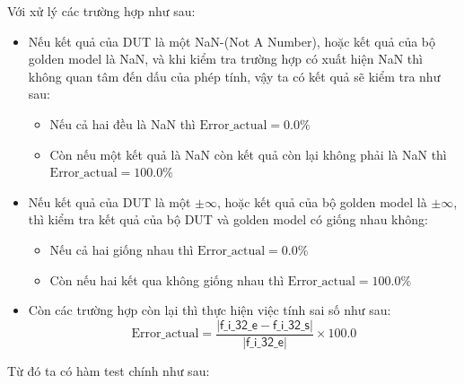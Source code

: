 Với xử lý các trường hợp như sau: 

\begin{itemize}
	\item Nếu kết quả của DUT là một NaN-(Not A Number), hoặc kết quả của bộ golden model là NaN, và khi kiểm tra trường hợp có xuất hiện NaN thì không quan tâm đến dấu của phép tính, vậy ta có kết quả sẽ kiểm tra như sau:
		\begin{itemize}
			\item Nếu cả hai đều là NaN thì $\text{Error\_actual} = 0.0 \%$
			\item Còn nếu một kết quả là NaN còn kết quả còn lại không phải là NaN thì $\text{Error\_actual} = 100.0 \%$
		\end{itemize}
	\item Nếu kết quả của DUT là một $\pm \infty$, hoặc kết quả của bộ golden model là $\pm \infty$, thì kiểm tra kết quả của bộ DUT và golden model có giống nhau không:
		\begin{itemize}
			\item Nếu cả hai giống nhau thì $\text{Error\_actual} = 0.0 \%$
			\item Còn nếu hai kết qua không giống nhau thì $\text{Error\_actual} = 100.0 \%$
		\end{itemize}
	\item Còn các trường hợp còn lại thì thực hiện việc tính sai số như sau:
	\[ \text{Error\_actual} = \dfrac{| \textsf{f\_i\_32\_e} - \textsf{f\_i\_32\_s} |}{| \textsf{f\_i\_32\_e} |} \times 100.0\]
\end{itemize}

Từ đó ta có hàm test chính như sau:

